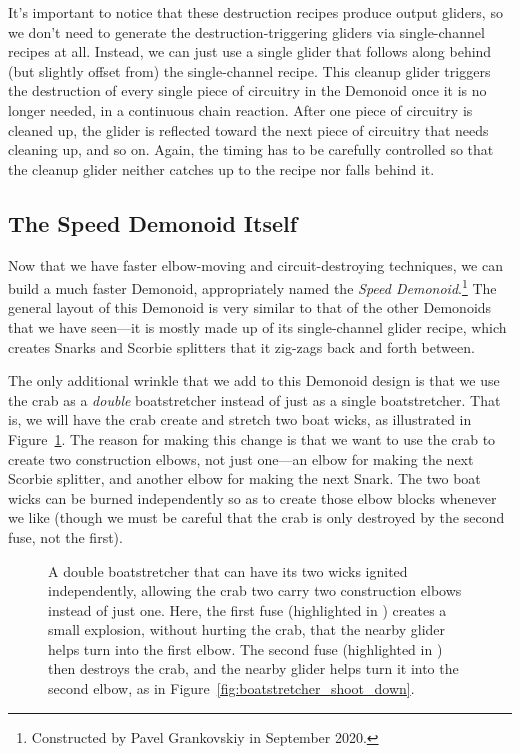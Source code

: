 It's important to notice that these destruction recipes produce output gliders, so we don't need to generate the destruction-triggering gliders via single-channel recipes at all. Instead, we can just use a single glider that follows along behind (but slightly offset from) the single-channel recipe. This cleanup glider triggers the destruction of every single piece of circuitry in the Demonoid once it is no longer needed, in a continuous chain reaction. After one piece of circuitry is cleaned up, the glider is reflected toward the next piece of circuitry that needs cleaning up, and so on. Again, the timing has to be carefully controlled so that the cleanup glider neither catches up to the recipe nor falls behind it.



\subsection{The Speed Demonoid Itself}\label{sec:speed_demonoid}

Now that we have faster elbow-moving and circuit-destroying techniques, we can build a much faster Demonoid, appropriately named the \emph{Speed Demonoid}.\footnote{Constructed by Pavel Grankovskiy in September 2020.} The general layout of this Demonoid is very similar to that of the other Demonoids that we have seen---it is mostly made up of its single-channel glider recipe, which creates Snarks and Scorbie splitters that it zig-zags back and forth between.

The only additional wrinkle that we add to this Demonoid design is that we use the crab as a \emph{double} boatstretcher instead of just as a single boatstretcher. That is, we will have the crab create and stretch two boat wicks, as illustrated in Figure~\ref{fig:double_boatstretcher_shoot_down}. The reason for making this change is that we want to use the crab to create two construction elbows, not just one---an elbow for making the next Scorbie splitter, and another elbow for making the next Snark. The two boat wicks can be burned independently so as to create those elbow blocks whenever we like (though we must be careful that the crab is only destroyed by the second fuse, not the first).

\begin{figure}[!htb]
	\centering
	
	\caption{A double boatstretcher that can have its two wicks ignited independently, allowing the crab two carry two construction elbows instead of just one. Here, the first fuse (highlighted in ) creates a small explosion, without hurting the crab, that the nearby glider helps turn into the first elbow. The second fuse (highlighted in ) then destroys the crab, and the nearby glider helps turn it into the second elbow, as in Figure~\ref{fig:boatstretcher_shoot_down}.}\label{fig:double_boatstretcher_shoot_down}
\end{figure}

